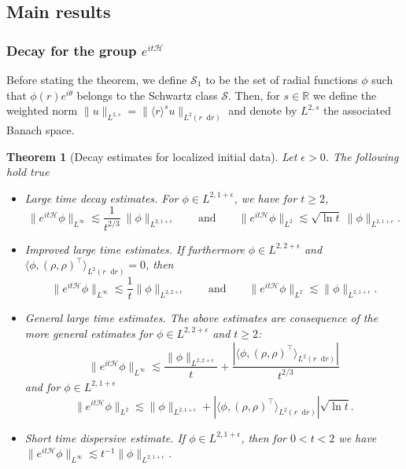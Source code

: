 \documentclass[11 pt]{amsart}
\newtheorem{thm}{Theorem}[section]
\theoremstyle{definition}
\theoremstyle{remark}
\numberwithin{equation}{section}
\newcommand{\dd}{\mathop{}\!\mathrm{d}}
\begin{document}
\subsection{Main results}

\subsubsection{Decay for the group $e^{it\mathcal{H}}$}  Before stating the theorem, we define $\mathcal{S}_1$ to be the set of radial functions $\phi$ such that $\phi(r) e^{i\theta}$ belongs to the Schwartz class $\mathcal{S}$. Then, for $s\in \mathbb R$ we define the weighted norm $\| u\|_{L^{2,s}}=\| \langle r \rangle^s u\|_{L^2(r\dd r)}$ and denote by $L^{2,s}$ the associated Banach space.

\begin{thm}[Decay estimates for localized initial data] 

\label{thmdecayschwartz}
Let $\epsilon>0$. The following hold true

\smallskip
\begin{itemize}
\item[(i)] \emph{Large time decay estimates.} For $\phi \in L^{2,1+\epsilon}$, we have for $t \geqslant2$,
$$
\| e^{it \mathcal{H}} \phi \|_{L^\infty} \lesssim \frac{1}{t^{2/3}} \ \| \phi\|_{L^{2,1+\epsilon}} \qquad \mbox{and} \qquad \| e^{it \mathcal{H}} \phi \|_{L^2} \lesssim \sqrt{\ln t } \ \| \phi\|_{L^{2,1+\epsilon}}.
$$

\smallskip

\item[(ii)] \emph{Improved large time estimates.} If furthermore $ \phi\in L^{2,2+\epsilon}$ and $\langle \phi , (\rho,\rho)^\top \rangle_{L^2(r \dd r)} =0$, then
$$
\| e^{it \mathcal{H}} \phi \|_{L^\infty} \lesssim \frac{1}{t}\| \phi\|_{L^{2,2+\epsilon}} \qquad \mbox{and} \qquad \| e^{it \mathcal{H}} \phi \|_{L^2} \lesssim \| \phi\|_{L^{2,1+\epsilon}}.
$$

\smallskip

\item[(iii)] \emph{General large time estimates.} The above estimates are consequence of the more general estimates for $\phi\in L^{2,2+\epsilon}$ and $t \geqslant2$:
$$
\| e^{it \mathcal{H}} \phi \|_{L^\infty} \lesssim \frac{\| \phi\|_{L^{2,2+\epsilon}}}{t}+\frac{|\langle \phi , (\rho,\rho)^\top \rangle_{L^2(r \dd r)}|}{t^{2/3}}
$$
and for $\phi\in L^{2,1+\epsilon}$
$$
\| e^{it \mathcal{H}} \phi \|_{L^2} \lesssim \| \phi\|_{L^{2,1+\epsilon}}+|\langle \phi , (\rho,\rho)^\top \rangle_{L^2(r \dd r)}| \sqrt{\ln t } .
$$

\smallskip

\item[(iv)] \emph{Short time dispersive estimate.} If $\phi \in L^{2,1+\epsilon}$, then for $0<t< 2$ we have $\| e^{it \mathcal{H}} \phi \|_{L^\infty}\lesssim t^{-1}\| \phi\|_{L^{2,1+\epsilon}}$.

\end{itemize}
\end{thm}
\end{document}
